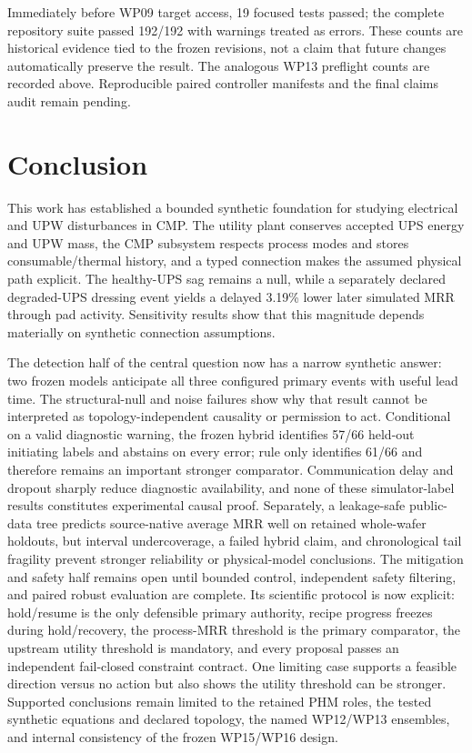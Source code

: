 \documentclass[10pt,twocolumn]{article}
\begin{document}
Immediately before WP09 target access, 19 focused tests passed; the complete
repository suite passed 192/192 with warnings treated as errors. These counts
are historical evidence tied to the frozen revisions, not a claim that future
changes automatically preserve the result. The analogous WP13 preflight counts
are recorded above. Reproducible paired controller manifests and the final
claims audit remain pending.

\section{Conclusion}

This work has established a bounded synthetic foundation for studying
electrical and UPW disturbances in CMP. The utility plant conserves accepted
UPS energy and UPW mass, the CMP subsystem respects process modes and stores
consumable/thermal history, and a typed connection makes the assumed physical
path explicit. The healthy-UPS sag remains a null, while a separately declared
degraded-UPS dressing event yields a delayed 3.19\% lower later simulated MRR
through pad activity. Sensitivity results show that this magnitude depends
materially on synthetic connection assumptions.

The detection half of the central question now has a narrow synthetic answer:
two frozen models anticipate all three configured primary events with useful
lead time. The structural-null and noise failures show why that result cannot
be interpreted as topology-independent causality or permission to act.
Conditional on a valid diagnostic warning, the frozen hybrid identifies 57/66
held-out initiating labels and abstains on every error; rule only identifies
61/66 and therefore remains an important stronger comparator. Communication
delay and dropout sharply reduce diagnostic availability, and none of these
simulator-label results constitutes experimental causal proof.
Separately, a leakage-safe public-data tree predicts source-native average MRR
well on retained whole-wafer holdouts, but interval undercoverage, a failed
hybrid claim, and chronological tail fragility prevent stronger reliability or
physical-model conclusions. The mitigation and safety half remains open until
bounded control, independent safety filtering, and paired robust evaluation are
complete. Its scientific protocol is now explicit: hold/resume is the only
defensible primary authority, recipe progress freezes during hold/recovery,
the process-MRR threshold is the primary comparator, the upstream utility
threshold is mandatory, and every proposal passes an independent fail-closed
constraint contract. One limiting case supports a feasible direction versus
no action but also shows the utility threshold can be stronger. Supported
conclusions remain limited to the retained PHM roles, the tested synthetic
equations and declared topology, the named WP12/WP13 ensembles, and internal
consistency of the frozen WP15/WP16 design.
\end{document}
